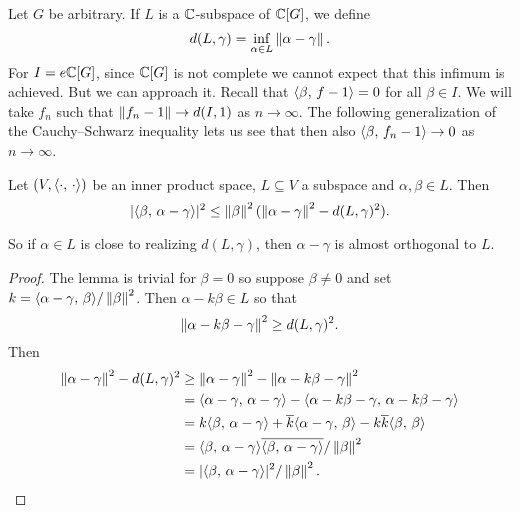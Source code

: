Let $G$ be arbitrary.
If $L$ is a $\mathbb{C}$-subspace of $\mathbb{C}[G]$, we define \[
    d(L, \gamma) = \inf_{\alpha \in L} \left\lVert \alpha - \gamma \right\rVert.
\]
For $I = e \mathbb{C}[G]$, since $\mathbb{C}[G]$ is not complete we cannot expect that this infimum is achieved.
But we can approach it.
Recall that $\langle \beta, \, f - 1 \rangle = 0$ for all $\beta \in I$.
We will take $f_n$ such that $\left\lVert f_n - 1 \right\rVert \to d(I, 1)$ as $n \to \infty$.
The following generalization of the Cauchy--Schwarz inequality lets us see that then also $\langle \beta, \, f_n - 1 \rangle \to 0$ as $n \to \infty$.

\begin{lemma}
    Let $(V, \langle \cdot, \, \cdot \rangle)$ be an inner product space, $L \subseteq V$ a subspace and $\alpha, \beta \in L$.
    Then \[
        \lvert \langle \beta, \, \alpha - \gamma \rangle \rvert^2 \leq \left\lVert \beta \right\rVert^2 ( \left\lVert \alpha - \gamma \right\rVert^2 - d(L, \gamma)^2).
    \]
\end{lemma}

So if $\alpha \in L$ is close to realizing $d(L, \gamma)$, then $\alpha - \gamma$ is almost orthogonal to $L$.

\begin{proof}
    The lemma is trivial for $\beta = 0$ so suppose $\beta \neq 0$ and set $k = \langle \alpha - \gamma, \, \beta \rangle / \left\lVert \beta \right\rVert^2$.
    Then $\alpha - k \beta \in L$ so that \[
        \left\lVert \alpha - k \beta - \gamma \right\rVert^2 \geq d(L, \gamma)^2.
    \]
    Then
    \begin{align*}
        \left\lVert \alpha - \gamma \right\rVert^2 - d(L, \gamma)^2
        &\geq \left\lVert \alpha - \gamma \right\rVert^2 - \left\lVert \alpha - k \beta - \gamma \right\rVert^2 \\
        &= \langle \alpha - \gamma, \, \alpha - \gamma \rangle - \langle \alpha - k \beta - \gamma, \, \alpha - k \beta - \gamma \rangle \\
        &= k \langle \beta, \, \alpha - \gamma \rangle + \overline{k} \langle \alpha - \gamma, \, \beta \rangle - k \overline{k} \langle \beta, \, \beta \rangle \\
        &= \langle \beta, \, \alpha - \gamma \rangle \overline{\langle \beta, \, \alpha - \gamma \rangle} / \left\lVert \beta \right\rVert^2 \\
        &= \lvert \langle \beta, \, \alpha - \gamma \rangle \rvert^2 / \left\lVert \beta \right\rVert^2.
    \end{align*}
\end{proof}

